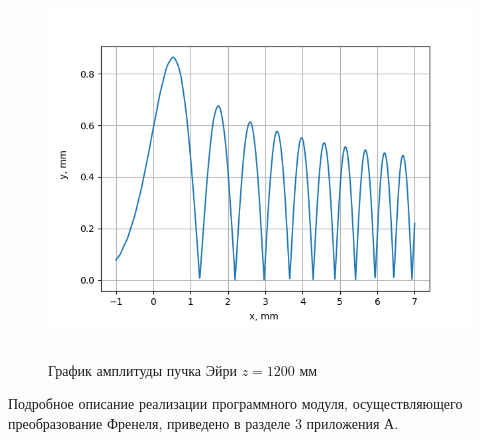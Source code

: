 {    \begin{figure}[H]
        \centering
        \includegraphics[height = 10cm]{plots/fres1200.png}
        \caption{График амплитуды пучка Эйри $z = 1200$ мм}
        \label{fres1200}
    \end{figure}
    \vspace{0.5cm}
    Подробное описание реализации программного модуля, осуществляющего преобразование Френеля, приведено в разделе 3 приложения А.

    }\label{sec:nohyphens2}

    \newpage
